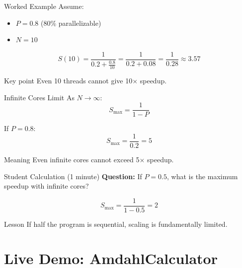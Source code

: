 \documentclass[11pt]{beamer}
\begin{document}
	\begin{frame}{Worked Example}
		Assume:
		\begin{itemize}
			\item $P = 0.8$ (80\% parallelizable)
			\item $N = 10$
		\end{itemize}
		

		\[
		S(10) = \frac{1}{0.2 + \frac{0.8}{10}}
		= \frac{1}{0.2 + 0.08}
		= \frac{1}{0.28}
		\approx 3.57
		\]

		\begin{alertblock}{Key point}
			Even 10 threads cannot give 10$\times$ speedup.
		\end{alertblock}
	\end{frame}
	
	\begin{frame}{Infinite Cores Limit}
		As $N \to \infty$:
		\[
		S_{\max} = \frac{1}{1-P}
		\]
		

		If $P=0.8$:
		\[
		S_{\max} = \frac{1}{0.2} = 5
		\]
		

		\begin{block}{Meaning}
			Even infinite cores cannot exceed 5$\times$ speedup.
		\end{block}
	\end{frame}
	
	\begin{frame}{Student Calculation (1 minute)}
		\textbf{Question:} If $P=0.5$, what is the maximum speedup with infinite cores?
		

		\[
		S_{\max} = \frac{1}{1-0.5} = 2
		\]
		

		\begin{alertblock}{Lesson}
			If half the program is sequential, scaling is fundamentally limited.
		\end{alertblock}
	\end{frame}
	
	\section{Live Demo: AmdahlCalculator}
	
\end{document}
